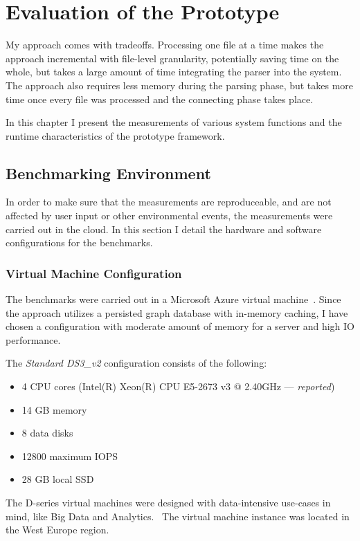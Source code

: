 \chapter{Evaluation of the Prototype}
\label{chap:evaluation-of-the-prototype}

My approach comes with tradeoffs. Processing one file at a time makes the approach incremental with file-level granularity, potentially saving time on the whole, but takes a large amount of time integrating the parser into the system. The approach also requires less memory during the parsing phase, but takes more time once every file was processed and the connecting phase takes place.

In this chapter I present the measurements of various system functions and the runtime characteristics of the prototype framework.

\section{Benchmarking Environment}
In order to make sure that the measurements are reproduceable, and are not affected by user input or other environmental events, the measurements were carried out in the cloud. In this section I detail the hardware and software configurations for the benchmarks.

\subsection{Virtual Machine Configuration}
The benchmarks were carried out in a Microsoft Azure virtual machine~\cite{azure-vm}. Since the approach utilizes a persisted graph database with in-memory caching, I have chosen a configuration with moderate amount of memory for a server and high IO performance.

The \emph{Standard DS3\_v2} configuration consists of the following:
\begin{itemize}[topsep=0pt]
  \item 4 CPU cores (Intel(R) Xeon(R) CPU E5-2673 v3 @ 2.40GHz --- \emph{reported})
  \item 14 GB memory
  \item 8 data disks
  \item 12800 maximum IOPS
  \item 28 GB local SSD
\end{itemize}

The D-series virtual machines were designed with data-intensive use-cases in mind, like Big Data and Analytics.~\cite{d-series} The virtual machine instance was located in the West Europe region.

